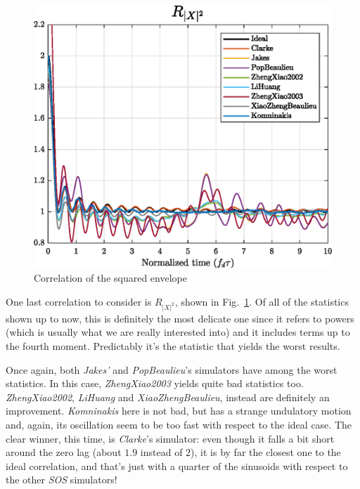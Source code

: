 \begin{figure}
	\centering
	\begin{minipage}{\linewidth}
		\includegraphics[width=\linewidth]{img/X2.eps}
	\end{minipage}
	
	\caption{Correlation of the squared envelope}
	\label{fig:R_X2}
\end{figure}

One last correlation to consider is $R_{|X|^2}$, shown in Fig.~\ref{fig:R_X2}. Of all of the statistics shown up to now, this is definitely the most delicate one since it refers to powers (which is usually what we are really interested into) and it includes terms up to the fourth moment. Predictably it's the statistic that yields the worst results.

Once again, both \textit{Jakes'} and \textit{PopBeaulieu}'s simulators have among the worst statistics. In this case, \textit{ZhengXiao2003} yields quite bad statistics too. \textit{ZhengXiao2002}, \textit{LiHuang} and \textit{XiaoZhengBeaulieu}, instead are definitely an improvement. \textit{Komninakis} here is not bad, but has a strange undulatory motion and, again, its oscillation seem to be too fast with respect to the ideal case. The clear winner, this time, is \textit{Clarke}'s simulator: even though it falls a bit short around the zero lag (about $1.9$ instead of $2$), it is by far the closest one to the ideal correlation, and that's just with a quarter of the sinusoids with respect to the other \textit{SOS} simulators!

